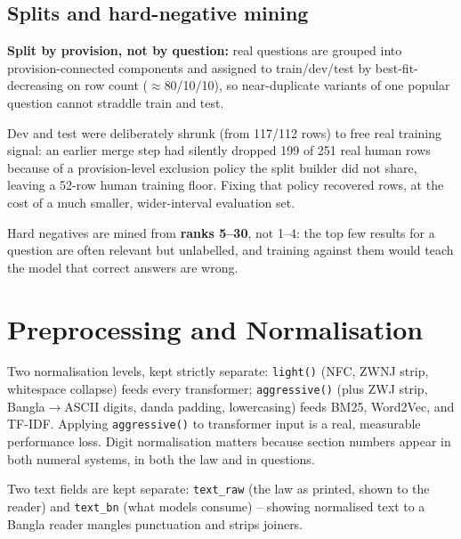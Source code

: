 \documentclass[10pt,a4paper]{article}
\begin{document}
\begin{sample}

\end{sample}

\subsection{Splits and hard-negative mining}
\label{sec:negatives}
\textbf{Split by provision, not by question:} real questions are grouped into provision-connected components and assigned to train/dev/test by best-fit-decreasing on row count ($\approx$80/10/10), so near-duplicate variants of one popular question cannot straddle train and test.

\begin{caution}
Dev and test were deliberately shrunk (from 117/112 rows) to free real training signal: an earlier merge step had silently dropped 199 of 251 real human rows because of a provision-level exclusion policy the split builder did not share, leaving a 52-row human training floor. Fixing that policy recovered \nTrainHuman{} rows, at the cost of a much smaller, wider-interval evaluation set.
\end{caution}

Hard negatives are mined from \textbf{ranks 5--30}, not 1--4: the top few results for a question are often relevant but unlabelled, and training against them would teach the model that correct answers are wrong.

\section{Preprocessing and Normalisation}
Two normalisation levels, kept strictly separate: \texttt{light()} (NFC, ZWNJ strip, whitespace collapse) feeds every transformer; \texttt{aggressive()} (plus ZWJ strip, Bangla$\to$ASCII digits, danda padding, lowercasing) feeds BM25, Word2Vec, and TF-IDF. Applying \texttt{aggressive()} to transformer input is a real, measurable performance loss. Digit normalisation matters because section numbers appear in both numeral systems, in both the law and in questions.

\begin{table}[H]
\centering

\caption{Real outputs of the two normalisers.}
\end{table}

Two text fields are kept separate: \texttt{text\_raw} (the law as printed, shown to the reader) and \texttt{text\_bn} (what models consume) -- showing normalised text to a Bangla reader mangles punctuation and strips joiners.
\end{document}
